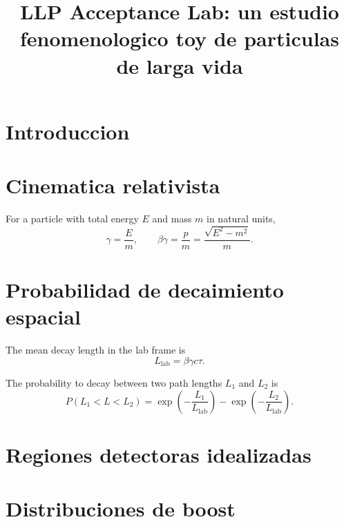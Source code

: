 \documentclass[11pt]{article}
\title{LLP Acceptance Lab: un estudio fenomenologico toy de particulas de larga vida}
\author{}
\date{}
\begin{document}
\maketitle

\section{Introduccion}


\section{Cinematica relativista}

For a particle with total energy $E$ and mass $m$ in natural units,
\begin{equation}
  \gamma = \frac{E}{m},
  \qquad
  \beta\gamma = \frac{p}{m}
  = \frac{\sqrt{E^2 - m^2}}{m}.
\end{equation}

\section{Probabilidad de decaimiento espacial}

The mean decay length in the lab frame is
\begin{equation}
  L_{\mathrm{lab}} = \beta\gamma c\tau.
\end{equation}

The probability to decay between two path lengths $L_1$ and $L_2$ is
\begin{equation}
  P(L_1 < L < L_2)
  = \exp\left(-\frac{L_1}{L_{\mathrm{lab}}}\right)
  - \exp\left(-\frac{L_2}{L_{\mathrm{lab}}}\right).
\end{equation}

\section{Regiones detectoras idealizadas}


\section{Distribuciones de boost}

\end{document}
